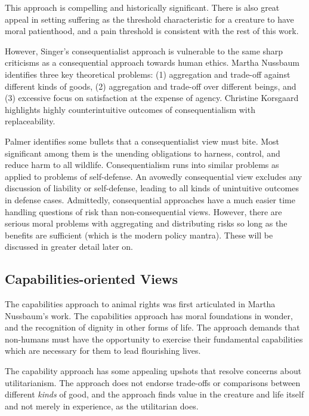 	This approach is compelling and historically significant. There is also great
	appeal in setting suffering as the threshold characteristic for a creature 
	to have moral patienthood, and a pain threshold is consistent with
	the rest of this work.

	However, Singer’s consequentialist approach is vulnerable to the same sharp
	criticisms as a consequential approach towards human ethics. Martha
	Nussbaum identifies three key theoretical problems: (1) aggregation and
	trade-off against different kinds of goods, (2) aggregation and trade-off
	over different beings, and (3) excessive focus on satisfaction at the
	expense of agency.\autocite[71]{nussbaum_frontiers} Christine Korsgaard
	highlights highly counterintuitive outcomes of consequentialism with
	replaceability.\autocite[11.9.2, 12.3.4]{korsgaard_fellow_creatures}
	 
	Palmer identifies some bullets that a consequentialist view must bite.
	Most significant among them is the unending obligations to harness,
	control, and reduce harm to all wildlife. Consequentialism runs into
	similar problems as applied to problems of self-defense. An avowedly
	consequential view excludes any discussion of liability or self-defense,
	leading to all kinds of unintuitive outcomes in defense cases. Admittedly,
	consequential approaches have a much easier time handling questions of risk
	than non-consequential views. However, there are serious moral problems
	with aggregating and distributing risks so long as the benefits are
	sufficient (which is the modern policy mantra). These will be discussed in
	greater detail later on.

	\subsection{Capabilities-oriented Views}

	The capabilities approach to animal rights was first articulated in Martha
	Nussbaum’s work.\autocite{nussbaum_frontiers} The capabilities approach has
	moral foundations in wonder, and the recognition of dignity in other forms
	of life.  The approach demands that non-humans must have the opportunity to
	exercise their fundamental capabilities which are necessary for them to
	lead flourishing lives.

	The capability approach has some appealing upshots that resolve concerns
	about utilitarianism.  The approach does not endorse trade-offs or
	comparisons between different \emph{kinds} of good, and the approach finds
	value in the creature and life itself and not merely in experience, as the
	utilitarian does.

